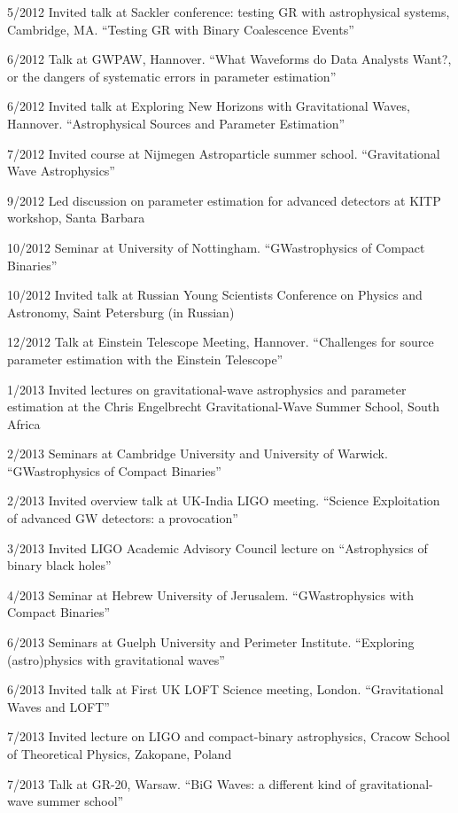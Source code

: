 \documentclass[margin,line]{res}
\begin{document}
\begin{resume}
5/2012 	Invited talk at Sackler conference: testing GR with astrophysical systems, Cambridge, MA. 	``Testing GR with Binary Coalescence Events''

6/2012 	Talk 	at GWPAW, Hannover.  ``What Waveforms do Data Analysts Want?, or the dangers of systematic errors in parameter estimation''

6/2012 	Invited talk at Exploring New Horizons with Gravitational Waves, Hannover.   ``Astrophysical Sources and Parameter Estimation''

7/2012	Invited course at Nijmegen Astroparticle summer school.  ``Gravitational Wave Astrophysics''

9/2012	Led discussion on parameter estimation for advanced detectors at KITP workshop, Santa Barbara

10/2012	Seminar at University of Nottingham.  ``GWastrophysics of Compact Binaries'' 

10/2012	Invited talk at Russian Young Scientists Conference on Physics and Astronomy, Saint Petersburg (in Russian)

12/2012	Talk at Einstein Telescope Meeting, Hannover.  ``Challenges for source parameter estimation with the Einstein Telescope''

1/2013 	Invited lectures on gravitational-wave astrophysics and parameter estimation at the Chris Engelbrecht Gravitational-Wave Summer School, South Africa

2/2013	Seminars at Cambridge University and University of Warwick.  ``GWastrophysics of Compact Binaries'' 

2/2013	Invited overview talk at UK-India LIGO meeting.  ``Science Exploitation of advanced GW detectors: a provocation''

3/2013	Invited LIGO Academic Advisory Council lecture on ``Astrophysics of binary black holes''

4/2013 	Seminar at Hebrew University of Jerusalem.  ``GWastrophysics with Compact Binaries'' 

6/2013	Seminars at Guelph University and Perimeter Institute.  ``Exploring (astro)physics with gravitational waves''

6/2013	Invited talk at First UK LOFT Science meeting, London.  ``Gravitational Waves 
and LOFT''

7/2013	Invited lecture on LIGO and compact-binary astrophysics, Cracow School of Theoretical Physics, Zakopane, Poland

7/2013	Talk at GR-20, Warsaw.  ``BiG Waves: a different kind of gravitational-wave summer school''
 

\end{resume}
\end{document}
